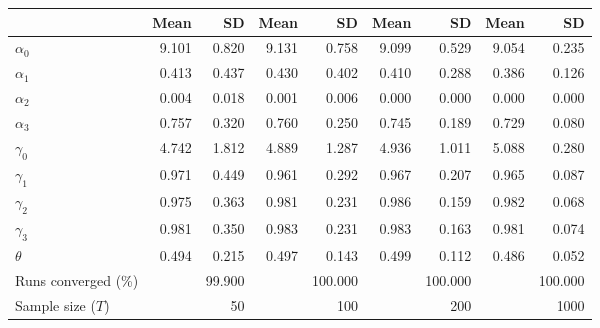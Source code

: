 
\begin{tabular}[t]{lrrrrrrrr}
\toprule
  & Mean & SD & Mean  & SD  & Mean   & SD   & Mean    & SD   \\
\midrule
$\alpha_{0}$ & 9.101 & 0.820 & 9.131 & 0.758 & 9.099 & 0.529 & 9.054 & 0.235\\
$\alpha_{1}$ & 0.413 & 0.437 & 0.430 & 0.402 & 0.410 & 0.288 & 0.386 & 0.126\\
$\alpha_{2}$ & 0.004 & 0.018 & 0.001 & 0.006 & 0.000 & 0.000 & 0.000 & 0.000\\
$\alpha_{3}$ & 0.757 & 0.320 & 0.760 & 0.250 & 0.745 & 0.189 & 0.729 & 0.080\\
$\gamma_{0}$ & 4.742 & 1.812 & 4.889 & 1.287 & 4.936 & 1.011 & 5.088 & 0.280\\
$\gamma_{1}$ & 0.971 & 0.449 & 0.961 & 0.292 & 0.967 & 0.207 & 0.965 & 0.087\\
$\gamma_{2}$ & 0.975 & 0.363 & 0.981 & 0.231 & 0.986 & 0.159 & 0.982 & 0.068\\
$\gamma_{3}$ & 0.981 & 0.350 & 0.983 & 0.231 & 0.983 & 0.163 & 0.981 & 0.074\\
$\theta$ & 0.494 & 0.215 & 0.497 & 0.143 & 0.499 & 0.112 & 0.486 & 0.052\\
Runs converged (\%) &  & 99.900 &  & 100.000 &  & 100.000 &  & 100.000\\
Sample size ($T$) &  & 50 &  & 100 &  & 200 &  & 1000\\
\bottomrule
\end{tabular}
